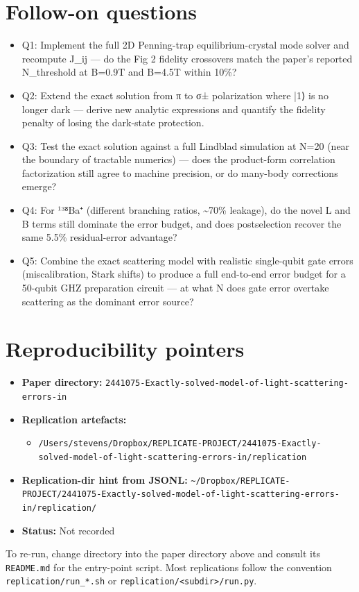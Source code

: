 \documentclass[11pt]{article}
\begin{document}
\section{Follow-on questions}
\begin{itemize}
\item Q1: Implement the full 2D Penning-trap equilibrium-crystal mode solver and recompute J\_ij — do the Fig 2 fidelity crossovers match the paper's reported N\_threshold at B=0.9T and B=4.5T within 10\%?
\item Q2: Extend the exact solution from π to σ± polarization where |1⟩ is no longer dark — derive new analytic expressions and quantify the fidelity penalty of losing the dark-state protection.
\item Q3: Test the exact solution against a full Lindblad simulation at N=20 (near the boundary of tractable numerics) — does the product-form correlation factorization still agree to machine precision, or do many-body corrections emerge?
\item Q4: For ¹³⁸Ba⁺ (different branching ratios, \textasciitilde{}70\% leakage), do the novel L and B terms still dominate the error budget, and does postselection recover the same 5.5\% residual-error advantage?
\item Q5: Combine the exact scattering model with realistic single-qubit gate errors (miscalibration, Stark shifts) to produce a full end-to-end error budget for a 50-qubit GHZ preparation circuit — at what N does gate error overtake scattering as the dominant error source?
\end{itemize}

\section{Reproducibility pointers}\label{sec:repro}
\begin{itemize}
\item \textbf{Paper directory:} \texttt{2441075-Exactly-solved-model-of-light-scattering-errors-in}
\item \textbf{Replication artefacts:}
\begin{itemize}
\item \texttt{/Users/stevens/Dropbox/REPLICATE-PROJECT/2441075-Exactly-solved-model-of-light-scattering-errors-in/replication}
\end{itemize}
\item \textbf{Replication-dir hint from JSONL:} \texttt{\textasciitilde{}/Dropbox/REPLICATE-PROJECT/2441075-Exactly-solved-model-of-light-scattering-errors-in/replication/}
\item \textbf{Status:} Not recorded
\end{itemize}

To re-run, change directory into the paper directory above and consult its \texttt{README.md} for the entry-point script. Most replications follow the convention \texttt{replication/run\_*.sh} or \texttt{replication/<subdir>/run.py}.
\end{document}
